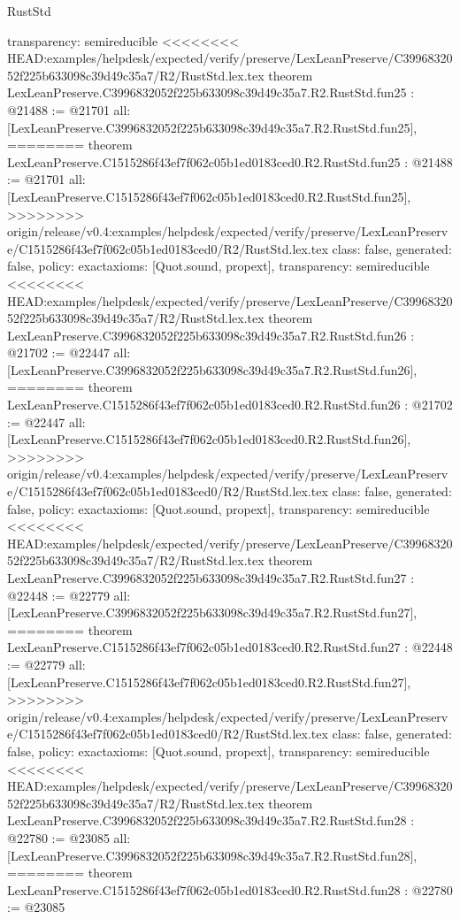 \begin{lexlean}{RustStd}
\begin{coremodule}
{\begin{coremodule}
{{{{{{{{{{{{{{{{{{{{{{{{{{{{  transparency: semireducible
}
<<<<<<<< HEAD:examples/helpdesk/expected/verify/preserve/LexLeanPreserve/C3996832052f225b633098c39d49c35a7/R2/RustStd.lex.tex
theorem LexLeanPreserve.C3996832052f225b633098c39d49c35a7.R2.RustStd.fun25 : @21488 := @21701 {
  all: [LexLeanPreserve.C3996832052f225b633098c39d49c35a7.R2.RustStd.fun25],
========
theorem LexLeanPreserve.C1515286f43ef7f062c05b1ed0183ced0.R2.RustStd.fun25 : @21488 := @21701 {
  all: [LexLeanPreserve.C1515286f43ef7f062c05b1ed0183ced0.R2.RustStd.fun25],
>>>>>>>> origin/release/v0.4:examples/helpdesk/expected/verify/preserve/LexLeanPreserve/C1515286f43ef7f062c05b1ed0183ced0/R2/RustStd.lex.tex
  class: false,
  generated: false,
  policy: exact{axioms: [Quot.sound, propext]},
  transparency: semireducible
}
<<<<<<<< HEAD:examples/helpdesk/expected/verify/preserve/LexLeanPreserve/C3996832052f225b633098c39d49c35a7/R2/RustStd.lex.tex
theorem LexLeanPreserve.C3996832052f225b633098c39d49c35a7.R2.RustStd.fun26 : @21702 := @22447 {
  all: [LexLeanPreserve.C3996832052f225b633098c39d49c35a7.R2.RustStd.fun26],
========
theorem LexLeanPreserve.C1515286f43ef7f062c05b1ed0183ced0.R2.RustStd.fun26 : @21702 := @22447 {
  all: [LexLeanPreserve.C1515286f43ef7f062c05b1ed0183ced0.R2.RustStd.fun26],
>>>>>>>> origin/release/v0.4:examples/helpdesk/expected/verify/preserve/LexLeanPreserve/C1515286f43ef7f062c05b1ed0183ced0/R2/RustStd.lex.tex
  class: false,
  generated: false,
  policy: exact{axioms: [Quot.sound, propext]},
  transparency: semireducible
}
<<<<<<<< HEAD:examples/helpdesk/expected/verify/preserve/LexLeanPreserve/C3996832052f225b633098c39d49c35a7/R2/RustStd.lex.tex
theorem LexLeanPreserve.C3996832052f225b633098c39d49c35a7.R2.RustStd.fun27 : @22448 := @22779 {
  all: [LexLeanPreserve.C3996832052f225b633098c39d49c35a7.R2.RustStd.fun27],
========
theorem LexLeanPreserve.C1515286f43ef7f062c05b1ed0183ced0.R2.RustStd.fun27 : @22448 := @22779 {
  all: [LexLeanPreserve.C1515286f43ef7f062c05b1ed0183ced0.R2.RustStd.fun27],
>>>>>>>> origin/release/v0.4:examples/helpdesk/expected/verify/preserve/LexLeanPreserve/C1515286f43ef7f062c05b1ed0183ced0/R2/RustStd.lex.tex
  class: false,
  generated: false,
  policy: exact{axioms: [Quot.sound, propext]},
  transparency: semireducible
}
<<<<<<<< HEAD:examples/helpdesk/expected/verify/preserve/LexLeanPreserve/C3996832052f225b633098c39d49c35a7/R2/RustStd.lex.tex
theorem LexLeanPreserve.C3996832052f225b633098c39d49c35a7.R2.RustStd.fun28 : @22780 := @23085 {
  all: [LexLeanPreserve.C3996832052f225b633098c39d49c35a7.R2.RustStd.fun28],
========
theorem LexLeanPreserve.C1515286f43ef7f062c05b1ed0183ced0.R2.RustStd.fun28 : @22780 := @23085 {
}}}}}}}}}}}}}}}}}}}}}}}}}}}}}}}}
\end{coremodule}}
\end{coremodule}
\end{lexlean}
